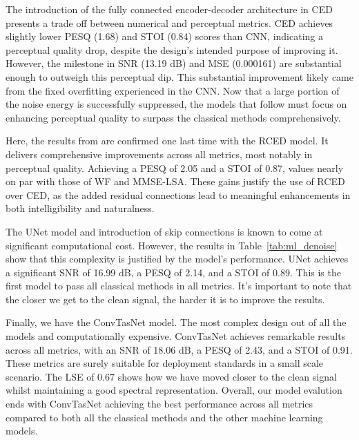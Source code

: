 The introduction of the fully connected encoder-decoder architecture in CED presents a trade off between numerical and perceptual metrics. CED achieves slightly lower PESQ (1.68) and STOI (0.84) scores than CNN, indicating a perceptual quality drop, despite the design's intended purpose of improving it. However, the milestone in SNR (13.19 dB) and MSE (0.000161) are substantial enough to outweigh this perceptual dip. This substantial improvement likely came from the fixed overfitting experienced in the CNN. Now that a large portion of the noise energy is successfully suppressed, the models that follow must focus on enhancing perceptual quality to surpass the classical methods comprehensively.

Here, the results from \cite{park2017acoustic} are confirmed one last time with the RCED model. It delivers comprehensive improvements across all metrics, most notably in perceptual quality. Achieving a PESQ of 2.05 and a STOI of 0.87, values nearly on par with those of WF and MMSE-LSA. These gains justify the use of RCED over CED, as the added residual connections lead to meaningful enhancements in both intelligibility and naturalness.

The UNet model and introduction of skip connections is known to come at significant computational cost. However, the results in Table~\ref{tab:ml_denoise} show that this complexity is justified by the model's performance. UNet achieves a significant SNR of 16.99 dB, a PESQ of 2.14, and a STOI of 0.89. This is the first model to pass all classical methods in all metrics. It’s important to note that the closer we get to the clean signal, the harder it is to improve the results.

Finally, we have the ConvTasNet model. The most complex design out of all the models and computationally expensive. ConvTasNet achieves remarkable results across all metrics, with an SNR of 18.06 dB, a PESQ of 2.43, and a STOI of 0.91. These metrics are surely suitable for deployment standards in a small scale scenario. The LSE of 0.67 shows how we have moved closer to the clean signal whilst maintaining a good spectral representation. Overall, our model evalution ends with ConvTasNet achieving the best performance across all metrics compared to both all the classical methods and the other machine learning models.

